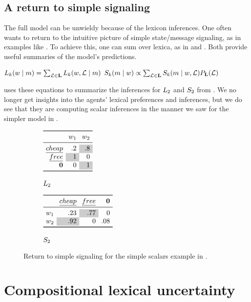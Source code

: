 \documentclass[12pt,twoside]{article}
\renewcommand{\_}{\textbf{\textunderscore\hspace{-4pt}\textunderscore\hspace{-3pt}\textunderscore\hspace{-4pt}\textunderscore}\hspace{0.5pt}}			%
\begin{document}

\subsection{A return to simple signaling}\label{sec:return}

The full model can be unwieldy because of the lexicon inferences.  One
often wants to return to the intuitive picture of simple state/message
signaling, as in examples like . To achieve this,
one can sum over lexica, as in  and . Both
provide useful summaries of the model's predictions.
%
\begin{exe}
\ex\label{lisnorm} $\ListenerK(\state \given \msg)  = \sum_{\Lex \in \LexSet} \ListenerK(\state, \Lex \given \msg)$
\ex\label{spknorm} $\SpeakerK(\msg \given \state) \propto \sum_{\Lex \in \LexSet} \SpeakerK(\msg \given \state, \Lex) \LexPrior(\Lex)$
\end{exe}
%
 uses these equations to summarize the
inferences for $\ListenerK[2]$ and $\SpeakerK[2]$ from
. We no longer get insights into the
agents' lexical preferences and inferences, but we do see that they
are computing scalar inferences in the manner we saw for the simpler
model in .

\begin{figure}[tp]
  \centering
  \begin{subfigure}[b]{0.4\textwidth}
    \centering
    $\examplelistener{.2 & \graycell{.8}}{\graycell{1} & 0}{0 & \graycell{1}}$
    \caption{$\ListenerK[2]$}
  \end{subfigure}
  \qquad
  \begin{subfigure}[b]{0.4\textwidth}
    \centering
    $\examplespeaker{.23 & \graycell{.77} & 0}{\graycell{.92} & 0 & .08}$
    \caption{$\SpeakerK[2]$}
  \end{subfigure}
  \caption{Return to simple signaling for the simple scalars example
    in .}
  \label{fig:marginalized}
\end{figure}


\section{Compositional lexical uncertainty}\label{sec:composition}
\end{document}
